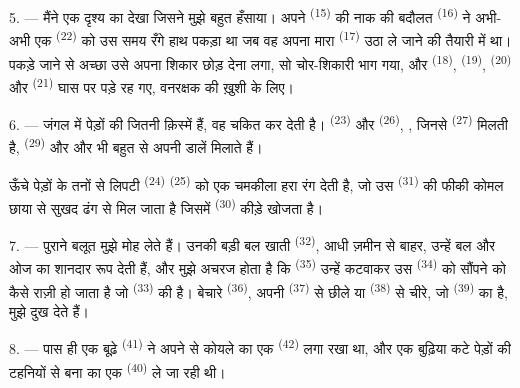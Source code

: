 5. --- मैंने एक दृश्य का  देखा जिसने मुझे बहुत हँसाया। अपने
 \textsuperscript{(15)} की नाक की बदौलत 
\textsuperscript{(16)} ने अभी-अभी एक  \textsuperscript{(22)} को
उस समय रँगे हाथ पकड़ा था जब वह अपना मारा  \textsuperscript{(17)}
उठा ले जाने की तैयारी में था। पकड़े जाने से अच्छा उसे अपना शिकार छोड़ देना लगा,
सो चोर-शिकारी भाग गया, और  \textsuperscript{(18)},
 \textsuperscript{(19)},  \textsuperscript{(20)} और
 \textsuperscript{(21)} घास पर पड़े रह गए, वनरक्षक की ख़ुशी के
लिए।

6. --- जंगल में पेड़ों की जितनी क़िस्में हैं, वह चकित कर देती है।
 \textsuperscript{(23)} और  \textsuperscript{(26)},
, जिनसे  \textsuperscript{(27)} मिलती है,
 \textsuperscript{(29)} और और भी बहुत से अपनी डालें मिलाते हैं।

ऊँचे पेड़ों के तनों से लिपटी  \textsuperscript{(24)}
 \textsuperscript{(25)} को एक चमकीला हरा रंग देती है, जो उस
 \textsuperscript{(31)} की फीकी कोमल छाया से सुखद ढंग से मिल जाता है
जिसमें  \textsuperscript{(30)} कीड़े खोजता है।

\VUsaut{3.0mm}
\VUsaut{3.0mm}

7. --- पुराने बलूत मुझे मोह लेते हैं। उनकी बड़ी बल खाती 
\textsuperscript{(32)}, आधी ज़मीन से बाहर, उन्हें बल और ओज का शानदार रूप देती
हैं, और मुझे अचरज होता है कि  \textsuperscript{(35)} उन्हें कटवाकर उस
\textsuperscript{(34)} को सौंपने को कैसे राज़ी हो जाता है जो
 \textsuperscript{(33)} की है। बेचारे  \textsuperscript{(36)},
अपनी  \textsuperscript{(37)} से छीले या 
\textsuperscript{(38)} से चीरे, जो  \textsuperscript{(39)}
का है, मुझे दुख देते हैं।

8. --- पास ही एक बूढ़े  \textsuperscript{(41)} ने अपने
 से कोयले का एक  \textsuperscript{(42)} लगा रखा था, और
एक बुढ़िया कटे पेड़ों की टहनियों से बना  का एक 
\textsuperscript{(40)} ले जा रही थी।

\VUsaut{3.0mm}
\VUsaut{3.0mm}

